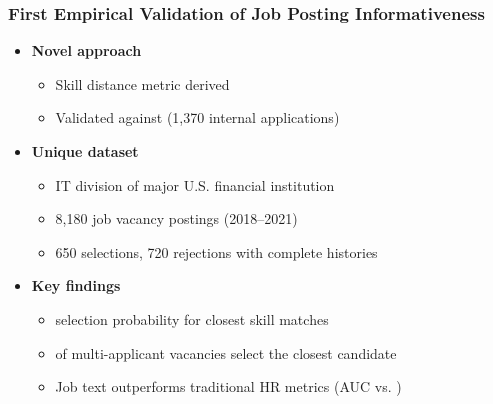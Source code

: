 \documentclass[11pt,xcolor={dvipsnames},hyperref={pdftex,pdfpagemode=UseNone,hidelinks,pdfdisplaydoctitle=true},usepdftitle=false]{beamer}
\begin{document}
\begin{frame}
\frametitle{First Empirical Validation of Job Posting Informativeness}
\begin{itemize}
\item \textbf{Novel approach}
  \begin{itemize}
  \item Skill distance metric derived 
  \item Validated against  (1,370 internal applications)
  \end{itemize}

\item \textbf{Unique dataset}
  \begin{itemize}
  \item IT division of major U.S. financial institution
  \item 8,180 job vacancy postings (2018–2021)
  \item 650 selections, 720 rejections with complete histories
  \end{itemize}

\item \textbf{Key findings}
  \begin{itemize}
  \item {} selection probability for closest skill matches
  \item {} of multi-applicant vacancies select the closest candidate
  \item Job text outperforms traditional HR metrics (AUC  vs. )
  \end{itemize}
\end{itemize}
\end{frame}
\end{document}
